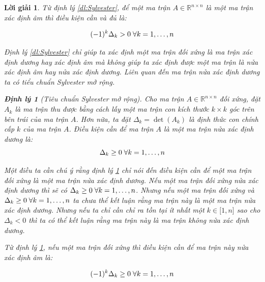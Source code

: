 \documentclass[14pt, a4paper]{article}
\newtheorem{dl}{Định lý}
\theoremstyle{sltheorem}
\theoremstyle{soltheorem}
\newtheorem*{loigiai}{Lời giải}
\begin{document}
\begin{loigiai}
        Từ định lý \ref{dl:Sylvester}, để một ma trận $A \in \mathbb{R}^{n \times n}$ là một ma trận xác định âm thì điều kiện cần và đủ là:

        \begin{equation*}
            (-1)^k \Delta_k > 0 \thickspace \forall k = 1,\dots,n
        \end{equation*}

        Định lý \ref{dl:Sylvester} chỉ giúp ta xác định một ma trận đối xứng là ma trận xác định dương hay xác định âm mà không giúp ta xác định được một ma trận là nửa xác định âm hay nửa xác định dương.
        Liên quan đến ma trận nửa xác định dương ta có tiểu chuẩn Sylvester mở rộng.

        \begin{dl}[Tiêu chuẩn Sylvester mở rộng] \label{dl:Extended-Sylvester}
            Cho ma trận $A \in \mathbb{R}^{n \times n}$ đối xứng, 
            đặt $A_k$ là ma trận thu được bằng cách lấy một ma trận con kích thước $k\times k$ góc trên bên trái của ma trận $A$. 
            Hơn nữa, ta đặt $\Delta_k=\det(A_k)$ là định thức con chính cấp $k$ của ma trận $A$.
            Điều kiện cần để ma trận $A$ là một ma trận nửa xác định dương là:
            \begin{equation*}
                \Delta_k \geq 0 \thickspace \forall k = 1,\dots,n
            \end{equation*}
        \end{dl}

        Một điều ta cần chú ý rằng định lý \ref{dl:Extended-Sylvester} chỉ nói đến điều kiện cần để một ma trận đối xứng là một ma trận nửa xác định dương.
        Nếu một ma trận đối xứng nửa xác định dương thì sẽ có $\Delta_k \geq 0 \thickspace \forall k = 1,\dots,n$. 
        Nhưng nếu một ma trận đối xứng và $\Delta_k \geq 0 \thickspace \forall k = 1,\dots,n$ ta chưa thể kết luận rằng ma trận này là một ma trận nửa xác định dương.
        Nhưng nếu ta chỉ cần chỉ ra tồn tại ít nhất một $k \in \lbrack 1, n \rbrack$ sao cho $\Delta_k < 0$ thì ta có thể kết luận rằng ma trận này là ma trận không nửa xác định dương.

        Từ định lý \ref{dl:Extended-Sylvester}, nếu một ma trận đối xứng thì điều kiện cần để ma trận này nửa xác định âm là:

        \begin{equation*}
            (-1)^k \Delta_k \geq 0 \thickspace \forall k = 1,\dots,n
        \end{equation*}


\end{loigiai}
\end{document}

